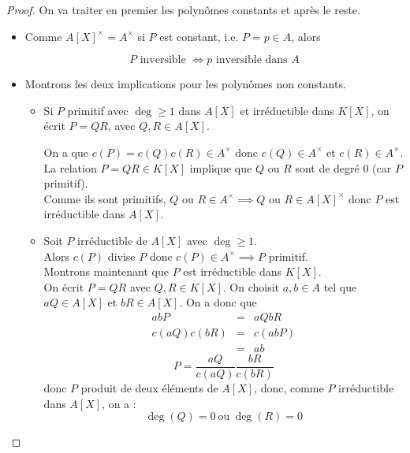 \begin{proof} On va traiter en premier les polynômes constants et après le reste.
	\begin{itemize}
		\item
		      Comme $A[X]^\times = A^\times$
		      si $P$ est constant, i.e. $P = p \in A$,
		      alors

		      $$ P \text{ inversible } \iff p \text{ inversible dans } A $$
		\item Montrons les deux implications pour les polynômes non constants.
		      \begin{itemize}
			      \item
			            Si $P$ primitif avec $\deg \geq 1$ dans $A[X]$ et irréductible dans $K[X]$, on écrit
			            $P = QR$, avec $Q,R \in A[X]$.

			            On a que $c(P) = c(Q) c(R) \in A^\times$ donc $c(Q) \in A^\times$ et $c(R) \in A^\times$. \\
			            La relation $P = QR \in K[X]$ implique que $Q$ ou $R$ sont de degré 0 (car $P$ primitif). \\
			            Comme ils sont primitifs, $Q \text{ ou } R \in A^\times \implies Q \text{ ou } R  \in A[X]^\times$
			            donc $P$ est irréductible dans $A[X]$.
			      \item
			            Soit $P$ irréductible de $A[X]$ avec $\deg \geq 1$. \\
			            Alors $c(P)$ divise $P$ donc $c(P) \in A^\times \implies P$ primitif.\\
			            Montrons maintenant que $P$ est irréductible dans $K[X]$.\\
			            On écrit $P = QR$ avec $Q,R \in K[X]$. On choisit $a,b \in A$ tel que $aQ \in A[X]$ et  $bR \in A[X]$.
			            On a donc que
			            \begin{eqnarray*}
				            abP &=& aQbR \\
				            c(aQ)c(bR) &=& c(abP) \\
				            &=& ab
			            \end{eqnarray*}
			            $$P = \frac{aQ}{c(aQ)} \frac{bR}{c(bR)} $$
			            donc $P$ produit de deux éléments de $A[X]$, donc, comme $P$ irréductible dans
			            $A[X]$, on a : $$ \deg (Q)= 0 \ \text{ou}\  \deg(R) = 0 $$
		      \end{itemize}
	\end{itemize}
\end{proof}
